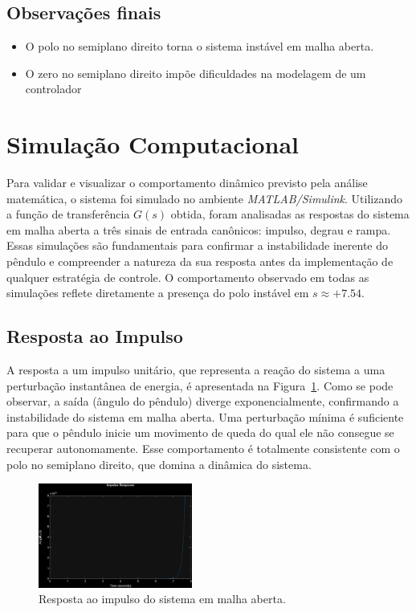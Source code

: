 \documentclass[9pt,a4paper,twocolumn,twoside]{tau-class/tau}
\begin{document}
\subsection{Observações finais}
\begin{itemize}
    \item O polo no semiplano direito torna o sistema instável em malha aberta.
    \item O zero no semiplano direito impõe dificuldades na modelagem de um controlador 
\end{itemize}

\section{Simulação Computacional}
Para validar e visualizar o comportamento dinâmico previsto pela análise matemática, o sistema foi simulado no ambiente \textit{MATLAB/Simulink}. Utilizando a função de transferência \(G(s)\) obtida, foram analisadas as respostas do sistema em malha aberta a três sinais de entrada canônicos: impulso, degrau e rampa. Essas simulações são fundamentais para confirmar a instabilidade inerente do pêndulo e compreender a natureza da sua resposta antes da implementação de qualquer estratégia de controle. O comportamento observado em todas as simulações reflete diretamente a presença do polo instável em \(s \approx +7.54\).

\subsection{Resposta ao Impulso}
A resposta a um impulso unitário, que representa a reação do sistema a uma perturbação instantânea de energia, é apresentada na Figura~\ref{fig:impulse}. Como se pode observar, a saída (ângulo do pêndulo) diverge exponencialmente, confirmando a instabilidade do sistema em malha aberta. Uma perturbação mínima é suficiente para que o pêndulo inicie um movimento de queda do qual ele não consegue se recuperar autonomamente. Esse comportamento é totalmente consistente com o polo no semiplano direito, que domina a dinâmica do sistema.

\begin{figure}[H]
    \centering
    \includegraphics[width=0.45\textwidth]{figures/impulse_response.jpeg}
    \caption{Resposta ao impulso do sistema em malha aberta.}
    \label{fig:impulse}
\end{figure}
\end{document}

